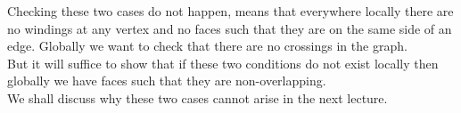 \documentclass{article}
\begin{document}
    Checking these two cases do not happen, means that everywhere locally there are no windings at any vertex and no faces such that they are on the same side of an edge.
    Globally we want to check that there are no crossings in the graph. \\
    But it will suffice to show that if these two conditions do not exist locally then globally we have faces such that they are non-overlapping.\\
    We shall discuss why these two cases cannot arise in the next lecture.
\end{document}
